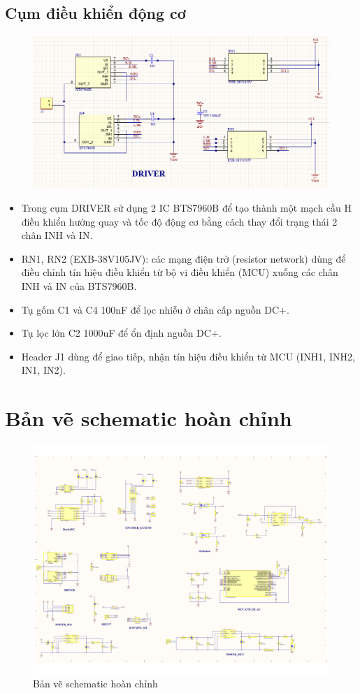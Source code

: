 \subsection{Cụm điều khiển động cơ}
\begin{figure}
    \centering
    \includegraphics[width=1\textwidth]{pictures/driver.png}
\end{figure}
\begin{itemize}
    \item Trong cụm DRIVER sử dụng 2 IC BTS7960B để tạo thành một mạch cầu H điều khiển hướng quay và tốc độ động cơ bằng cách thay đổi trạng thái 2 chân INH và IN.
    \item RN1, RN2 (EXB-38V105JV): các mạng điện trở (resistor network) dùng để điều chỉnh tín hiệu điều khiển từ bộ vi điều khiển (MCU) xuống các chân INH và IN của BTS7960B.
    \item Tụ gốm C1 và C4 100nF để lọc nhiễu ở chân cấp nguồn DC+.
    \item Tụ lọc lớn C2 1000uF để ổn định nguồn DC+.
    \item Header J1 dùng để giao tiếp, nhận tín hiệu điều khiển từ MCU (INH1, INH2, IN1, IN2).
\end{itemize}


\section{Bản vẽ schematic hoàn chỉnh}
\begin{figure}[H]
    \centering
    \includegraphics[width=1\textwidth]{pictures/ISO_current.png}
    \caption{Bản vẽ schematic hoàn chỉnh}
\end{figure}
\cleardoublepage
